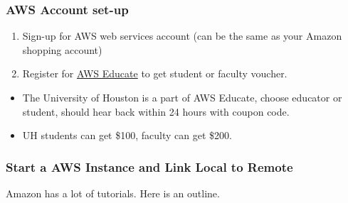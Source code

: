 \documentclass[
]{book}
\providecommand{\tightlist}{%
  \setlength{\itemsep}{0pt}\setlength{\parskip}{0pt}}
\begin{document}
\hypertarget{aws-account-set-up}{%
\subsubsection{AWS Account set-up}\label{aws-account-set-up}}

\begin{enumerate}
\def\labelenumi{\arabic{enumi}.}
\tightlist
\item
  Sign-up for AWS web services account (can be the same as your Amazon shopping account)
\item
  Register for \href{https://aws.amazon.com/education/awseducate/}{AWS Educate} to get student or faculty voucher.
\end{enumerate}

\begin{itemize}
\tightlist
\item
  The University of Houston is a part of AWS Educate, choose educator or student, should hear back within 24 hours with coupon code.
\item
  UH students can get \$100, faculty can get \$200.
\end{itemize}

\hypertarget{start-a-aws-instance-and-link-local-to-remote}{%
\subsubsection{Start a AWS Instance and Link Local to Remote}\label{start-a-aws-instance-and-link-local-to-remote}}

Amazon has a lot of tutorials. Here is an outline.
\end{document}
